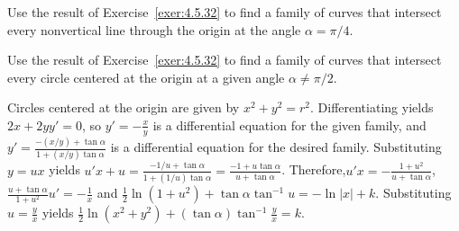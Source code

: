 \documentclass{ximera}
\begin{document}
\begin{problem}\label{exer:4.5.33}
Use the result of Exercise~\ref{exer:4.5.32} to find a family of curves
that intersect every nonvertical line through the origin at the angle
$\alpha=\pi/4$.
\end{problem}

\begin{problem}\label{exer:4.5.34}
Use the result of Exercise~\ref{exer:4.5.32} to find a family of curves
that intersect every circle centered at the origin at a given angle
$\alpha \ne \pi/2$.

\begin{solution}
Circles centered at the origin are given by $x^2+y^2=r^2$.
Differentiating yields $2x+2yy'=0$, so $y'=-\frac{x}{y}$ is a
differential equation for the given family, and
$y'=\frac{-(x/y)+\tan\alpha}{1+(x/y)\tan\alpha}$ is a differential
equation for the desired family. Substituting $y=ux$ yields
$u'x+u=\frac{-1/u+\tan\alpha}{1+(1/u)\tan\alpha}=\frac{-1+u\tan\alpha}{u+\tan\alpha}$. Therefore,$u'x=-\frac{1+u^2}{u+\tan\alpha}$,
$\frac{u+\tan\alpha}{1+u^2}u'=-\frac{1}{x}$ and
$\frac{1}{2}\ln(1+u^2)+\tan\alpha\tan^{-1}u=-\ln|x|+k$. Substituting
$u=\frac{y}{x}$ yields $\frac{1}{2}\ln (x^2+y^2)+(\tan\alpha)
\tan^{-1}\frac{y}{x}=k$.
\end{solution}
\end{problem}
\end{document}
